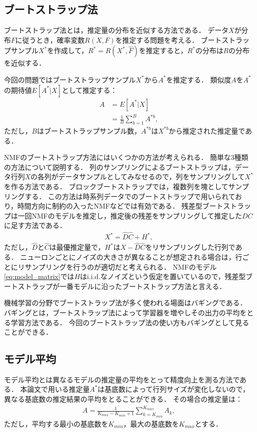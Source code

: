\subsection{ブートストラップ法}
ブートストラップ法\cite{Efron1979}とは，推定量の分布を近似する方法である．
データ$X$が分布$F$に従うとき，確率変数$R(X,F)$を推定する問題を考える．
ブートストラップサンプル$X^*$を作成して，$R^* = R(X^*, \hat{F})$を推定すると，$R^*$の分布は$R$の分布を近似する．

今回の問題ではブートストラップサンプル$X^*$から$A^*$を推定する．
類似度$A$を$A^*$の期待値$E[A^*|X]$として推定する：
\begin{align}
	A &= E[A^*|X] \\
	&=\frac{1}{B} \sum_{b=1}^B A^{*b},
\end{align}
ただし，$B$はブートストラップサンプル数，$A^{*b}$は$X^{*b}$から推定された推定量である．

NMFのブートストラップ方法にはいくつかの方法が考えられる．
簡単な3種類の方法について説明する．
列のサンプリングによるブートストラップは，データ行列$X$の各列がデータサンプルとしてみなせるので，列をサンプリングして$X^*$を作る方法である．
ブロックブートストラップでは，複数列を塊としてサンプリングする．
この方法は時系列データでのブートストラップで用いられており，時間方向に制約の入ったNMFなどでは有効である．
残差型ブートストラップは一回NMFのモデルを推定し，推定後の残差をサンプリングして推定した$DC$に足す方法である．
\begin{align}
	X^* = \hat{D} \hat{C} + H^*,
\end{align}
ただし，$\hat{D}$と$\hat{C}$は最優推定量で，$H^*$は$X - \hat{D}\hat{C}$をリサンプリングした行列である．
ニューロンごとにノイズの大きさが異なることが想定される場合は，行ごとにリサンプリングを行うのが適切だと考えられる．
NMFのモデル\eqref{eq:model_matrix}では$H$はi.i.d.なノイズという仮定を置いているので，残差型ブートストラップが一番モデルに沿ったブートストラップ方法と言える．

機械学習の分野でブートストラップ法が多く使われる場面はバギング\cite{Breiman1996}である．
バギングとは，ブートストラップ法によって学習器を増やしその出力の平均をとる学習方法である．
今回のブートストラップ法の使い方もバギングとして見ることができる．

\subsection{モデル平均}
モデル平均とは異なるモデルの推定量の平均をとって精度向上を測る方法である．
本論文で用いる推定量$A^*$は基底数によって行列サイズが変化しないので，異なる基底数の推定結果の平均をとることができる．
その場合の推定量は：
\begin{align}
	A = \frac{1}{K_{max} - K_{min} + 1} \sum_{k=K_{min}}^{K_{max}} A_k,
\end{align}
ただし，平均する最小の基底数を$K_{min}$，最大の基底数を$K_{max}$とする．

